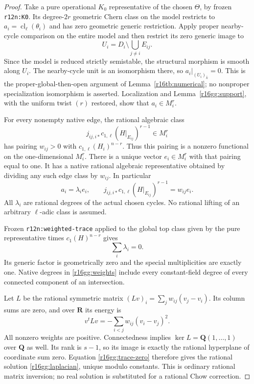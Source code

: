 \begin{proof}
Take a pure operational $K_0$ representative of the chosen
$\Theta$, by frozen \texttt{r12n:K0}. Its degree-$2r$ geometric
Chern class on the model restricts to
$a_i=\operatorname{cl}_\ell(\theta_i)$ and has zero geometric
generic restriction. Apply proper nearby-cycle comparison on
the entire model and then restrict its zero generic image to
\[
                  U_i=D_i\setminus\bigcup_{j\ne i}E_{ij}.
\]
Since the model is reduced strictly semistable, the structural
morphism is smooth along $U_i$. The nearby-cycle unit is an
isomorphism there, so $a_i|_{(U_i)_{\bar k}}=0$.
This is the proper-global-then-open argument of
Lemma~\ref{r16tb:numerical}; no nonproper specialization
isomorphism is asserted. Localization and
Lemma~\ref{r16gg:support}, with the uniform twist $(r)$ restored,
show that $a_i\in M_i^r$.

For every nonempty native edge, the rational algebraic class
\[
        j_{ij,i*}c_{1,\ell}(H|_{E_{ij}})^{r-1}\in M_i^r
\]
has pairing $w_{ij}>0$ with $c_{1,\ell}(H_i)^{n-r}$.
Thus this pairing is a nonzero functional on the one-dimensional
$M_i^r$. There is a unique vector $e_i\in M_i^r$ with that
pairing equal to one. It has a native rational algebraic
representative obtained by dividing any such edge class by
$w_{ij}$. In particular
\[
                   a_i=\lambda_i e_i,\qquad
 j_{ij,i*}c_{1,\ell}(H|_{E_{ij}})^{r-1}=w_{ij}e_i.
 \tag{GG16.9}\label{r16gg:normalized-lines}
\]
All $\lambda_i$ are rational degrees of the actual chosen cycles.
No rational lifting of an arbitrary $\ell$-adic class is assumed.

Frozen \texttt{r12n:weighted-trace} applied to the global top
class given by the pure representative times $c_1(H)^{n-r}$
gives
\[
                             \sum_i\lambda_i=0.
 \tag{GG16.10}\label{r16gg:trace-zero}
\]
Its generic factor is geometrically zero and the special
multiplicities are exactly one. Native degrees in
\eqref{r16gg:weights} include every constant-field degree
of every connected component of an intersection.

Let $L$ be the rational symmetric matrix
$(Lv)_i=\sum_jw_{ij}(v_j-v_i)$. Its column sums are zero,
and over $\mathbf R$ its energy is
\[
                 v^tLv=-\sum_{i<j}w_{ij}(v_i-v_j)^2.
 \tag{GG16.11}\label{r16gg:energy}
\]
All nonzero weights are positive. Connectedness implies
$\ker L=\mathbf Q(1,\ldots,1)$ over $\mathbf Q$ as well.
Its rank is $s-1$, so its image is exactly the rational
hyperplane of coordinate sum zero. Equation
\eqref{r16gg:trace-zero} therefore gives the rational solution
\eqref{r16gg:laplacian}, unique modulo constants. This is
ordinary rational matrix inversion; no real solution is
substituted for a rational Chow correction.


\end{proof}
